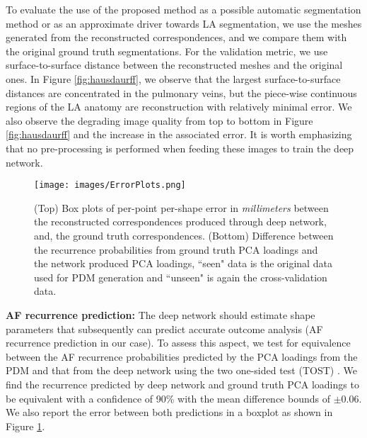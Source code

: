 \documentclass[twocolumn]{cinc}
\begin{document}
To evaluate the use of the proposed method as a possible automatic segmentation method or as an approximate driver towards LA segmentation, we use the meshes generated from the reconstructed correspondences, and we compare them with the original ground truth segmentations. For the validation metric, we use surface-to-surface distance between the reconstructed meshes and the original ones. In Figure \ref{fig:hausdaurff}, we observe that the largest surface-to-surface distances are concentrated in the pulmonary veins, but the piece-wise continuous regions of the LA anatomy are reconstruction with relatively minimal error. We also observe the degrading image quality from top to bottom in Figure \ref{fig:hausdaurff} and the increase in the associated error. It is worth emphasizing that no pre-processing is performed when feeding these images to train the deep network.

\begin{figure}[!t]
\centering
\texttt{[image: images/ErrorPlots.png]}
\vspace{-0.1in}
\caption{(Top) Box plots of per-point per-shape error  in \emph{millimeters} between the reconstructed correspondences produced through deep network, and, the ground truth correspondences. (Bottom) Difference between the recurrence probabilities from ground truth PCA loadings and the network produced PCA loadings, ``seen" data is the original data used for PDM generation and ``unseen" is again the cross-validation data.}
\vspace{-0.2in}
\label{fig:boxplots}
\end{figure}

\vspace{0.05in}
\noindent\textbf{AF recurrence prediction: }
The deep network should estimate shape parameters that subsequently can predict accurate outcome analysis (AF recurrence prediction in our case). 
To assess this aspect, we test for equivalence between the AF recurrence probabilities predicted by the PCA loadings from the PDM and that from the deep network using the two one-sided test (TOST) \cite{schuirmann1987tost}. We find the recurrence predicted by deep network and ground truth PCA loadings to be equivalent with a confidence of 90\% with the mean difference bounds of $\pm 0.06$. We also report the error between both predictions in a boxplot as shown in Figure \ref{fig:boxplots}. 
\end{document}
